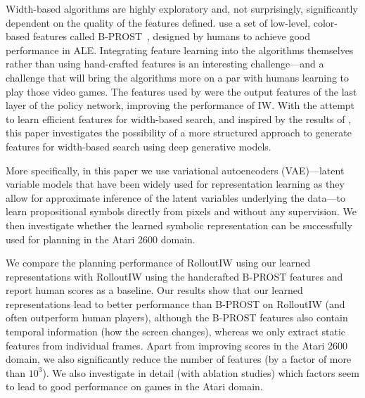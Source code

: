 Width-based algorithms are highly exploratory and, not surprisingly, significantly dependent on the quality of the features defined. 
\citet{rolloutiw-orginal} use
a set of low-level, color-based features called B-PROST~\cite{liang},
designed by humans to achieve good performance in ALE. Integrating feature learning
into the algorithms themselves rather than using hand-crafted features is an interesting challenge---and a challenge that will bring the algorithms more on a par with humans learning to play those video games. The features used by \citet{RLIW} were the output features of the last layer of the policy network, improving the performance of IW. With the attempt to learn efficient features for width-based search, and inspired by the results of \citet{RLIW}, this paper investigates the possibility of a more structured approach to generate features for width-based search using deep generative models. 

More specifically, in this paper we use variational autoencoders (VAE)---latent variable models that have been widely used for representation learning \cite{kingma2019introduction} as they allow for approximate inference of the latent variables underlying the data---to learn propositional symbols directly from pixels and without any supervision.
We then investigate whether the learned symbolic representation can be successfully used for planning in the Atari 2600 domain. 

We compare the planning performance of RolloutIW using our learned representations with RolloutIW using the handcrafted B-PROST features and report human scores as a baseline.
Our results show that our learned representations lead to better performance than B-PROST on RolloutIW (and often outperform human players), although the B-PROST features also contain temporal information (how the screen changes), whereas we only extract static features from individual frames. 
Apart from improving scores in the Atari 2600 domain, we also significantly reduce the number of features (by a factor of more than $10^3$). 
We also investigate in detail (with ablation studies) which factors seem to lead to good performance on games in the Atari domain.

